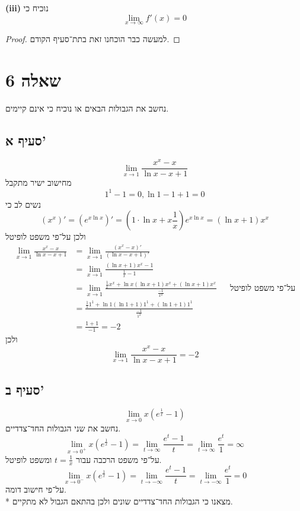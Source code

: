 \textbf{(iii)}
נוכיח כי
\[
	\lim_{x \to \infty} f'(x) = 0
\]
\begin{proof}
	למעשה כבר הוכחנו זאת בתת־סעיף הקודם.
\end{proof}

\section{שאלה 6}
נחשב את הגבולות הבאים או נוכיח כי אינם קיימים.

\subsection{סעיף א'}
\[
	\lim_{x \to 1} \frac{x^x - x}{\ln x - x + 1}
\]
מחישוב ישיר מתקבל
\[
	1^1 - 1 = 0, \ln 1 - 1 + 1 = 0
\]
נשים לב כי
\[
	(x^x)' = (e^{x \ln x})' = (1 \cdot \ln x + x \frac{1}{x}) e^{x \ln x} = (\ln x + 1) x^x
\]
ולכן על־פי משפט לופיטל
\begin{align*}
	\lim_{x \to 1} \frac{x^x - x}{\ln x - x + 1}
	& = \lim_{x \to 1} \frac{(x^x - x)'}{(\ln x - x + 1)'} \\
	& = \lim_{x \to 1} \frac{(\ln x + 1) x^x - 1}{\frac{1}{x} - 1} \\
	& = \lim_{x \to 1} \frac{\frac{1}{x} x^x + \ln x (\ln x + 1) x^x + (\ln x + 1) x^x}{\frac{-1}{x^2}} && \text{על־פי משפט לופיטל} \\
	& = \frac{\frac{1}{1} 1^1 + \ln 1 (\ln 1 + 1) 1^1 + (\ln 1 + 1) 1^1}{\frac{-1}{1^2}} \\
	& = \frac{1 + 1}{-1} = -2
\end{align*}
ולכן
\[
	\lim_{x \to 1} \frac{x^x - x}{\ln x - x + 1} = -2
\]

\subsection{סעיף ב'}
\[
	\lim_{x \to 0} x (e^\frac{1}{x} - 1)
\]
נחשב את שני הגבולות החד־צדדיים.
\[
	\lim_{x \to 0^+} x (e^\frac{1}{x} - 1)
	= \lim_{t \to \infty} \frac{e^t - 1}{t}
	= \lim_{t \to \infty} \frac{e^t}{1}
	= \infty
\]
על־פי משפט הרכבה עבור $t = \frac{1}{x}$ ומשפט לופיטל.
\[
	\lim_{x \to 0^-} x (e^\frac{1}{x} - 1)
	= \lim_{t \to -\infty} \frac{e^t - 1}{t}
	= \lim_{t \to -\infty} \frac{e^t}{1}
	= 0
\]
על־פי חישוב דומה. \\*
מצאנו כי הגבולות החד־צדדיים שונים ולכן בהתאם הגבול לא מתקיים.

